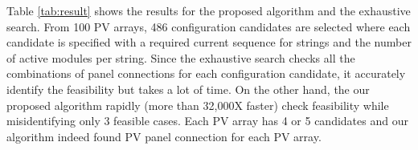 \documentclass[conference]{IEEEtran}
\begin{document}
Table \ref{tab:result} shows the results for the proposed algorithm and the exhaustive search.
From 100 PV arrays, 486 configuration candidates are selected where each candidate is specified with a required current sequence for strings and the number of active modules per string.
Since the exhaustive search checks all the combinations of panel connections for each configuration candidate, it accurately identify the feasibility but takes a lot of time.
On the other hand, the our proposed algorithm rapidly (more than 32,000X faster) check feasibility while misidentifying only 3 feasible cases. 
Each PV array has 4 or 5 candidates and our algorithm indeed found PV panel connection for each PV array.

\end{document}
